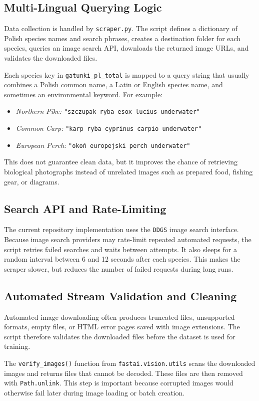 \documentclass[11pt,a4paper,oneside]{article}
\begin{document}
\subsection{Multi-Lingual Querying Logic}
Data collection is handled by \texttt{scraper.py}. The script defines a dictionary of Polish species names and search phrases, creates a destination folder for each species, queries an image search API, downloads the returned image URLs, and validates the downloaded files.

Each species key in \texttt{gatunki\_pl\_total} is mapped to a query string that usually combines a Polish common name, a Latin or English species name, and sometimes an environmental keyword. For example:
\begin{itemize}
    \item \textit{Northern Pike:} \texttt{"szczupak ryba esox lucius underwater"}
    \item \textit{Common Carp:} \texttt{"karp ryba cyprinus carpio underwater"}
    \item \textit{European Perch:} \texttt{"okoń europejski perch underwater"}
\end{itemize}
This does not guarantee clean data, but it improves the chance of retrieving biological photographs instead of unrelated images such as prepared food, fishing gear, or diagrams.

\subsection{Search API and Rate-Limiting}
The current repository implementation uses the \texttt{DDGS} image search interface. Because image search providers may rate-limit repeated automated requests, the script retries failed searches and waits between attempts. It also sleeps for a random interval between 6 and 12 seconds after each species. This makes the scraper slower, but reduces the number of failed requests during long runs.

\subsection{Automated Stream Validation and Cleaning}
Automated image downloading often produces truncated files, unsupported formats, empty files, or HTML error pages saved with image extensions. The script therefore validates the downloaded files before the dataset is used for training.

The \texttt{verify\_images()} function from \texttt{fastai.vision.utils} scans the downloaded images and returns files that cannot be decoded. These files are then removed with \texttt{Path.unlink}. This step is important because corrupted images would otherwise fail later during image loading or batch creation.
\end{document}
